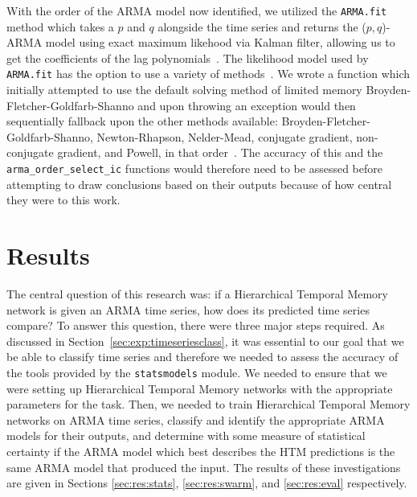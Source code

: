 \documentclass[oneside,12pt,openany]{book}
\begin{document}
    With the order of the ARMA model now identified, we utilized the \texttt{ARMA.fit} method which takes a $p$ and $q$ alongside the time series and returns the ($p,q$)-ARMA model using exact maximum likehood via Kalman filter, allowing us to get the coefficients of the lag polynomials~\cite{statsmodels}. The likelihood model used by \texttt{ARMA.fit} has the option to use a variety of methods~\cite{statsmodels}. We wrote a function which initially attempted to use the default solving method of limited memory Broyden-Fletcher-Goldfarb-Shanno and upon throwing an exception would then sequentially fallback upon the other methods available: Broyden-Fletcher-Goldfarb-Shanno, Newton-Rhapson, Nelder-Mead, conjugate gradient, non-conjugate gradient, and Powell, in that order~\cite{statsmodels}. The accuracy of this and the \texttt{arma\_order\_select\_ic} functions would therefore need to be assessed before attempting to draw conclusions based on their outputs because of how central they were to this work.
    
    
	
    
    
    
    
    
    
    
	
	
	
	\chapter{Results}

	The central question of this research was: if a Hierarchical Temporal Memory network is given an ARMA time series, how does its predicted time series compare? To answer this question, there were three major steps required. As discussed in Section~\ref{sec:exp:timeseriesclass}, it was essential to our goal that we be able to classify time series and therefore we needed to assess the accuracy of the tools provided by the \texttt{statsmodels} module. We needed to ensure that we were setting up Hierarchical Temporal Memory networks with the appropriate parameters for the task. Then, we needed to train Hierarchical Temporal Memory networks on ARMA time series, classify and identify the appropriate ARMA models for their outputs, and determine with some measure of statistical certainty if the ARMA model which best describes the HTM predictions is the same ARMA model that produced the input. The results of these investigations are given in Sections \ref{sec:res:stats}, \ref{sec:res:swarm}, and \ref{sec:res:eval} respectively.
    
\end{document}
